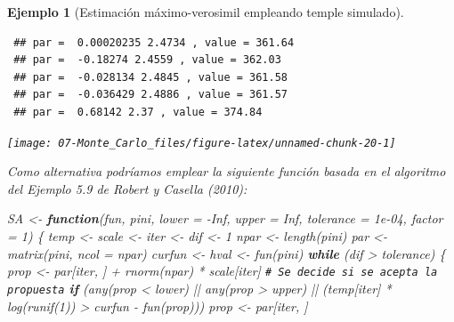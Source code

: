 \documentclass[
  10pt,
]{book}
\newenvironment{Shaded}{\begin{snugshade}}{\end{snugshade}}
\newcommand{\AttributeTok}[1]{\textcolor[rgb]{0.77,0.63,0.00}{#1}}
\newcommand{\CommentTok}[1]{\textcolor[rgb]{0.56,0.35,0.01}{\textit{#1}}}
\newcommand{\ConstantTok}[1]{\textcolor[rgb]{0.00,0.00,0.00}{#1}}
\newcommand{\ControlFlowTok}[1]{\textcolor[rgb]{0.13,0.29,0.53}{\textbf{#1}}}
\newcommand{\DecValTok}[1]{\textcolor[rgb]{0.00,0.00,0.81}{#1}}
\newcommand{\FloatTok}[1]{\textcolor[rgb]{0.00,0.00,0.81}{#1}}
\newcommand{\FunctionTok}[1]{\textcolor[rgb]{0.00,0.00,0.00}{#1}}
\newcommand{\NormalTok}[1]{#1}
\newcommand{\OtherTok}[1]{\textcolor[rgb]{0.56,0.35,0.01}{#1}}
\newcommand{\SpecialCharTok}[1]{\textcolor[rgb]{0.00,0.00,0.00}{#1}}
\theoremstyle{break}
\newtheorem{example}{Ejemplo}[chapter]
\theoremstyle{nonumberplain}
\renewcommand{\CommentTok}[1]{\textcolor[rgb]{0.41,0.41,0.41}{\texttt{#1}}}
\begin{document}
\begin{example}[Estimación máximo-verosimil empleando temple simulado]
\begin{verbatim}
 ## par =  0.00020235 2.4734 , value = 361.64 
 ## par =  -0.18274 2.4559 , value = 362.03 
 ## par =  -0.028134 2.4845 , value = 361.58 
 ## par =  -0.036429 2.4886 , value = 361.57 
 ## par =  0.68142 2.37 , value = 374.84
\end{verbatim}

\begin{center}\texttt{[image: 07-Monte\_Carlo\_files/figure-latex/unnamed-chunk-20-1]} \end{center}

Como alternativa podríamos emplear la siguiente función basada en el algoritmo del Ejemplo 5.9 de Robert y Casella (2010):

\begin{Shaded}
\begin{Highlighting}[]
\NormalTok{SA }\OtherTok{\textless{}{-}} \ControlFlowTok{function}\NormalTok{(fun, pini, }\AttributeTok{lower =} \SpecialCharTok{{-}}\ConstantTok{Inf}\NormalTok{, }\AttributeTok{upper =} \ConstantTok{Inf}\NormalTok{, }\AttributeTok{tolerance =} \FloatTok{1e{-}04}\NormalTok{, }\AttributeTok{factor =} \DecValTok{1}\NormalTok{) \{}
\NormalTok{  temp }\OtherTok{\textless{}{-}}\NormalTok{ scale }\OtherTok{\textless{}{-}}\NormalTok{ iter }\OtherTok{\textless{}{-}}\NormalTok{ dif }\OtherTok{\textless{}{-}} \DecValTok{1}
\NormalTok{  npar }\OtherTok{\textless{}{-}} \FunctionTok{length}\NormalTok{(pini) }
\NormalTok{  par }\OtherTok{\textless{}{-}} \FunctionTok{matrix}\NormalTok{(pini, }\AttributeTok{ncol =}\NormalTok{ npar)}
\NormalTok{  curfun }\OtherTok{\textless{}{-}}\NormalTok{ hval }\OtherTok{\textless{}{-}} \FunctionTok{fun}\NormalTok{(pini)}
  \ControlFlowTok{while}\NormalTok{ (dif }\SpecialCharTok{\textgreater{}}\NormalTok{ tolerance) \{}
\NormalTok{    prop }\OtherTok{\textless{}{-}}\NormalTok{ par[iter, ] }\SpecialCharTok{+} \FunctionTok{rnorm}\NormalTok{(npar) }\SpecialCharTok{*}\NormalTok{ scale[iter]}
    \CommentTok{\# Se decide si se acepta la propuesta}
    \ControlFlowTok{if}\NormalTok{ (}\FunctionTok{any}\NormalTok{(prop }\SpecialCharTok{\textless{}}\NormalTok{ lower) }\SpecialCharTok{||} \FunctionTok{any}\NormalTok{(prop }\SpecialCharTok{\textgreater{}}\NormalTok{ upper) }\SpecialCharTok{||} 
\NormalTok{        (temp[iter] }\SpecialCharTok{*} \FunctionTok{log}\NormalTok{(}\FunctionTok{runif}\NormalTok{(}\DecValTok{1}\NormalTok{)) }\SpecialCharTok{\textgreater{}}\NormalTok{ curfun }\SpecialCharTok{{-}} \FunctionTok{fun}\NormalTok{(prop)))  prop }\OtherTok{\textless{}{-}}\NormalTok{ par[iter, ]}

\end{Highlighting}
\end{Shaded}
\end{example}
\end{document}
